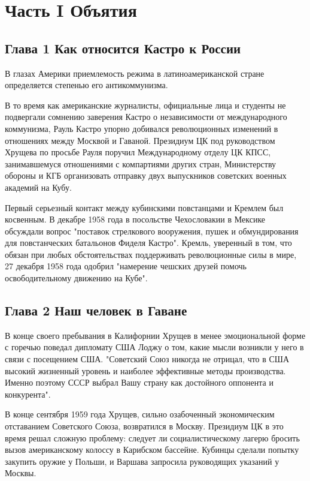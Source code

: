 \documentclass[14pt]{extreport}
\begin{document}
\tableofcontents

\chapter{Часть I Объятия}

\section{Глава 1 Как относится Кастро к России}
В глазах Америки приемлемость режима в латиноамериканской стране определяется степенью его антикоммунизма.

В то время как американские журналисты, официальные лица и студенты не подвергали сомнению заверения Кастро о независимости от международного коммунизма, Рауль Кастро упорно добивался революционных изменений в отношениях между Москвой и Гаваной. Президиум ЦК под руководством Хрущева по просьбе Рауля поручил Международному отделу ЦК КПСС, занимавшемуся отношениями с компартиями других стран, Министерству обороны и КГБ организовать отправку двух выпускников советских военных академий на Кубу.

Первый серьезный контакт между кубинскими повстанцами и Кремлем был косвенным. В декабре 1958 года в посольстве Чехословакии в Мексике обсуждали вопрос "поставок стрелкового вооружения, пушек и обмундирования для повстанческих батальонов Фиделя Кастро". Кремль, уверенный в том, что обязан при любых обстоятельствах поддерживать революционные силы в мире, 27 декабря 1958 года одобрил "намерение чешских друзей помочь освободительному движению на Кубе".

\section{Глава 2 Наш человек в Гаване}

В конце своего пребывания в Калифорнии Хрущев в менее эмоциональной форме с горечью поведал дипломату США Лоджу о том, какие мысли возникли у него в связи с посещением США. "Советский Союз никогда не отрицал, что в США высокий жизненный уровень и наиболее эффективные методы производства. Именно поэтому СССР выбрал Вашу страну как достойного оппонента и конкурента". 

В конце сентября 1959 года Хрущев, сильно озабоченный экономическим отставанием Советского Союза, возвратился в Москву. Президиум ЦК в это время решал сложную проблему: следует ли социалистическому лагерю бросить вызов американскому колоссу в Карибском бассейне. Кубинцы сделали попытку закупить оружие у Польши, и Варшава запросила руководящих указаний у Москвы. 
\end{document}
